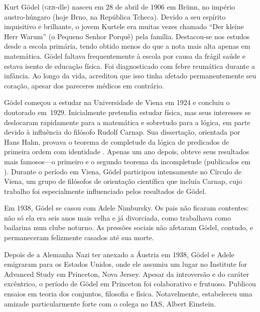 \documentclass[../../../include/open-logic-section]{subfiles}
\begin{document}



Kurt G{\"o}del (\textsc{ger}-dle) nasceu em 28 de abril de 1906 em
Br{\"u}nn, no império austro-húngaro (hoje Brno, na República Tcheca).
Devido a seu espírito inquisitivo e brilhante, o jovem Kurtele era
muitas vezes chamado ``Der kleine Herr Warum'' (o Pequeno Senhor
Porquê) pela família. Destacou-se nos estudos desde a escola
primária, tendo obtido menos do que a nota mais alta apenas em
matemática. G{\"o}del faltava frequentemente à escola por causa da
frágil saúde e estava isento de educação física. Foi diagnosticado
com febre reumática durante a infância. Ao longo da vida, acreditou
que isso tinha afetado permanentemente seu coração, apesar dos
pareceres médicos em contrário.

G{\"o}del começou a estudar na Universidade de Viena em 1924 e
concluiu o doutorado em~1929. Inicialmente pretendia estudar
física, mas seus interesses se deslocaram rapidamente para a
matemática e sobretudo para a lógica, em parte devido à influência do
filósofo Rudolf Carnap. Sua dissertação, orientada por Hans Hahn,
provava o teorema de completude da lógica de predicados de primeira
ordem com identidade \citep{Godel1929}. Apenas um ano depois, obteve
seus resultados mais famosos---o primeiro e o segundo teorema da
incompletude (publicados em \citealt{Godel1931}). Durante o período
em Viena, G{\"o}del participou intensamente no Círculo de Viena, um
grupo de filósofos de orientação científica que incluía Carnap, cujo
trabalho foi especialmente influenciado pelos resultados de G{\"o}del.

Em 1938, G\"odel se casou com Adele Nimbursky. Os pais não ficaram
contentes: não só ela era seis anos mais velha e já divorciada, como
trabalhava como bailarina num clube noturno.
As pressões sociais não afetaram G{\"o}del, contudo,
e permaneceram felizmente casados até sua morte.

Depois de a Alemanha Nazi ter anexado a Áustria em 1938, G{\"o}del e
Adele emigraram para os Estados Unidos, onde ele assumiu um lugar no
Institute for Advanced Study em Princeton, Nova Jersey. Apesar da
introversão e do caráter excêntrico, o período de G{\"o}del em
Princeton foi colaborativo e frutuoso.  Publicou ensaios em teoria dos
conjuntos, filosofia e física. Notavelmente, estabeleceu uma amizade
particularmente forte com o colega no IAS, Albert Einstein.
\end{document}
